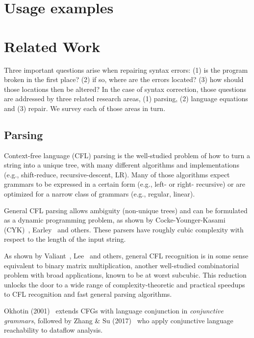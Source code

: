\documentclass[sigplan,review,anonymous,acmsmall]{acmart}\settopmatter{printfolios=false,printccs=false,printacmref=false}
\begin{document}
\pagebreak\section{Usage examples}\label{sec:examples}



\pagebreak\section{Related Work}\label{sec:related}

Three important questions arise when repairing syntax errors: (1) is the program broken in the first place? (2) if so, where are the errors located? (3) how should those locations then be altered? In the case of syntax correction, those questions are addressed by three related research areas, (1) parsing, (2) language equations and (3) repair. We survey each of those areas in turn.

\subsection{Parsing}

Context-free language (CFL) parsing is the well-studied problem of how to turn a string into a unique tree, with many different algorithms and implementations (e.g., shift-reduce, recursive-descent, LR). Many of those algorithms expect grammars to be expressed in a certain form (e.g., left- or right- recursive) or are optimized for a narrow class of grammars (e.g., regular, linear).

General CFL parsing allows ambiguity (non-unique trees) and can be formulated as a dynamic programming problem, as shown by Cocke-Younger-Kasami (CYK)~\cite{sakai1961syntax}, Earley~\cite{earley1970efficient} and others. These parsers have roughly cubic complexity with respect to the length of the input string.

As shown by Valiant~\cite{valiant1975general}, Lee~\cite{lee2002fast} and others, general CFL recognition is in some sense equivalent to binary matrix multiplication, another well-studied combinatorial problem with broad applications, known to be at worst subcubic. This reduction unlocks the door to a wide range of complexity-theoretic and practical speedups to CFL recognition and fast general parsing algorithms.

Okhotin (2001)~\cite{okhotin2001conjunctive} extends CFGs with language conjunction in \textit{conjunctive grammars}, followed by Zhang \& Su (2017)~\cite{zhang2017context} who apply conjunctive language reachability to dataflow analysis.
\end{document}
